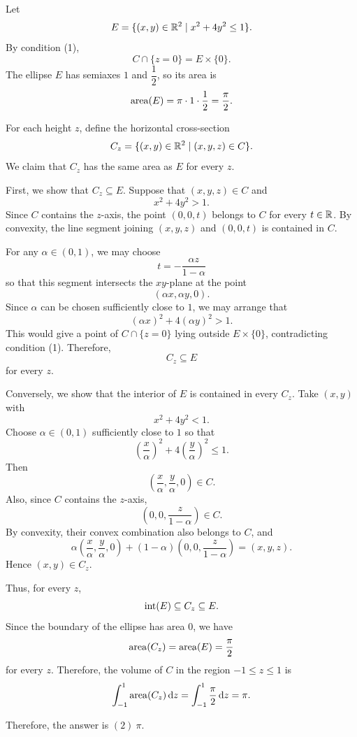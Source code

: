     \begin{solution}
        Let
        \[
            E=\{(x,y)\in\mathbb{R}^2\mid x^2+4y^2\leq 1\}.
        \]
        By condition (1),
        \[
            C\cap\{z=0\}=E\times\{0\}.
        \]
        The ellipse $E$ has semiaxes $1$ and $\dfrac{1}{2}$, so its area is
        \[
            \operatorname{area}(E)
            =
            \pi\cdot 1\cdot \frac{1}{2}
            =
            \frac{\pi}{2}.
        \]

        For each height $z$, define the horizontal cross-section
        \[
            C_z
            =
            \{(x,y)\in\mathbb{R}^2\mid (x,y,z)\in C\}.
        \]
        We claim that $C_z$ has the same area as $E$ for every $z$.

        First, we show that $C_z\subseteq E$. Suppose that $(x,y,z)\in C$ and
        \[
            x^2+4y^2>1.
        \]
        Since $C$ contains the $z$-axis, the point $(0,0,t)$ belongs to $C$ for every $t\in\mathbb{R}$. By
        convexity, the line segment joining $(x,y,z)$ and $(0,0,t)$ is contained in $C$.

        For any $\alpha\in(0,1)$, we may choose
        \[
            t=-\frac{\alpha z}{1-\alpha}
        \]
        so that this segment intersects the $xy$-plane at the point
        \[
            (\alpha x,\alpha y,0).
        \]
        Since $\alpha$ can be chosen sufficiently close to $1$, we may arrange that
        \[
            (\alpha x)^2+4(\alpha y)^2>1.
        \]
        This would give a point of $C\cap\{z=0\}$ lying outside $E\times\{0\}$, contradicting
        condition (1). Therefore,
        \[
            C_z\subseteq E
        \]
        for every $z$.

        Conversely, we show that the interior of $E$ is contained in every $C_z$. Take $(x,y)$ with
        \[
            x^2+4y^2<1.
        \]
        Choose $\alpha\in(0,1)$ sufficiently close to $1$ so that
        \[
            \left(\frac{x}{\alpha}\right)^2
            +
            4\left(\frac{y}{\alpha}\right)^2
            \leq 1.
        \]
        Then
        \[
            \left(\frac{x}{\alpha},\frac{y}{\alpha},0\right)\in C.
        \]
        Also, since $C$ contains the $z$-axis,
        \[
            \left(0,0,\frac{z}{1-\alpha}\right)\in C.
        \]
        By convexity, their convex combination also belongs to $C$, and
        \[
            \alpha
            \left(\frac{x}{\alpha},\frac{y}{\alpha},0\right)
            +
            (1-\alpha)
            \left(0,0,\frac{z}{1-\alpha}\right)
            =
            (x,y,z).
        \]
        Hence $(x,y)\in C_z$.

        Thus, for every $z$,
        \[
            \operatorname{int}(E)\subseteq C_z\subseteq E.
        \]
        Since the boundary of the ellipse has area $0$, we have
        \[
            \operatorname{area}(C_z)=\operatorname{area}(E)=\frac{\pi}{2}
        \]
        for every $z$. Therefore, the volume of $C$ in the region $-1\leq z\leq 1$ is
        \[
            \int_{-1}^{1}\operatorname{area}(C_z)\mathop{}\!\mathrm{d} z
            =
            \int_{-1}^{1}\frac{\pi}{2}\mathop{}\!\mathrm{d} z
            =
            \pi.
        \]

        Therefore, the answer is $\boxed{(2)\ \pi}$.
    \end{solution}

